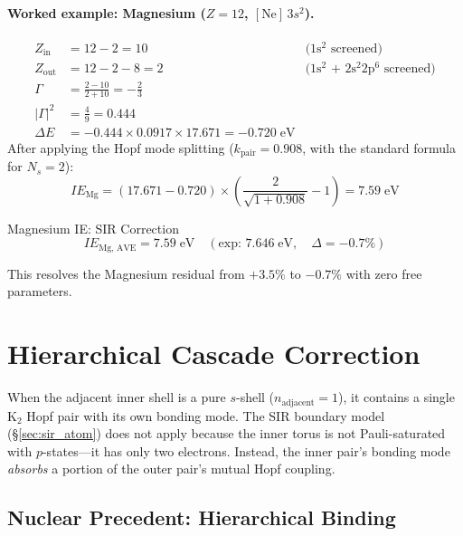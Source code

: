 \paragraph{Worked example: Magnesium ($Z = 12$, $[\text{Ne}]\,3s^2$).}
\begin{align}
    Z_\text{in}  &= 12 - 2 = 10      & \text{(1s$^2$ screened)} \\
    Z_\text{out} &= 12 - 2 - 8 = 2   & \text{(1s$^2$ + 2s$^2$2p$^6$ screened)} \\
    \Gamma &= \frac{2 - 10}{2 + 10} = -\frac{2}{3} \\
    |\Gamma|^2 &= \frac{4}{9} = 0.444 \\
    \Delta E &= -0.444 \times 0.0917 \times 17.671 = -0.720\;\text{eV}
\end{align}
After applying the Hopf mode splitting ($k_\text{pair} = 0.908$, with the standard formula for $N_s = 2$):
\begin{equation}
    IE_\text{Mg} = (17.671 - 0.720) \times \left(\frac{2}{\sqrt{1 + 0.908}} - 1\right) = 7.59\;\text{eV}
\end{equation}
\begin{resultbox}{Magnesium IE: SIR Correction}
\begin{equation}
    IE_\text{Mg, AVE} = 7.59\;\text{eV} \quad (\text{exp: } 7.646\;\text{eV}, \quad \Delta = -0.7\%)
\end{equation}
\end{resultbox}
This resolves the Magnesium residual from $+3.5\%$ to $-0.7\%$ with zero free parameters.


\section{Hierarchical Cascade Correction}
\label{sec:hierarchical_cascade_correction}

When the adjacent inner shell is a pure $s$-shell ($n_\text{adjacent} = 1$), it contains a single K$_2$ Hopf pair with its own bonding mode.  The SIR boundary model (\S\ref{sec:sir_atom}) does not apply because the inner torus is not Pauli-saturated with $p$-states---it has only two electrons.  Instead, the inner pair's bonding mode \emph{absorbs} a portion of the outer pair's mutual Hopf coupling.

\subsection{Nuclear Precedent: Hierarchical Binding}

